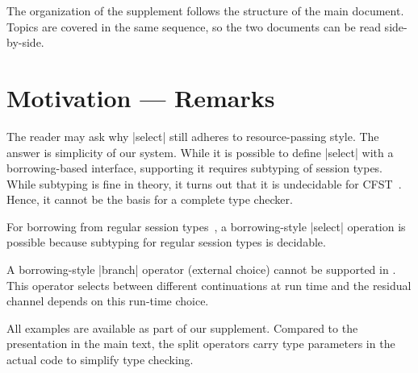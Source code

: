 

\appendix


The organization of the supplement follows the structure of the main document.
Topics are covered in the same sequence, so the two documents can be read
side-by-side.


\section{Motivation --- Remarks}
\label{sec:remarks}


{\BorrowCodeStyle

The reader may ask why |select| still adheres to
resource-passing style. The answer is simplicity of our system. While it
is possible to define |select| with a borrowing-based
interface, supporting it requires subtyping of session types. While
subtyping is fine in theory, it turns out that it is undecidable for
CFST~\cite{DBLP:journals/toplas/Padovani19}. Hence, it cannot be the
basis for a complete type checker.

For borrowing from regular session
types~\cite{DBLP:journals/pacmpl/SaffrichS0V25}, a borrowing-style
|select| operation is possible because subtyping for regular
session types is decidable.

A borrowing-style |branch| operator (external choice) cannot be supported in \thecalculus.
This operator selects between different continuations at run time and
the residual channel depends on this run-time choice.


All \thecalculus examples are available as part of our supplement. Compared to the
presentation in the main text, the split operators carry type
parameters in the actual code to simplify type checking.

}

